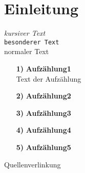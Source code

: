 \chapter{Einleitung}
\textit{kursiver Text} \\
\texttt{besonderer Text} \\
normaler Text
\begin{itemize}
\item[\textbf{1)}] \textbf{Aufzählung1}\\
Text der Aufzählung
\item [\textbf{2)}]\textbf{Aufzählung2}
\item [\textbf{3)}]\textbf{Aufzählung3}
\item [\textbf{4)}]\textbf{Aufzählung4}
\item [\textbf{5)}]\textbf{Aufzählung5}
\end{itemize}
Quellenverlinkung \cite{UCS_XDL_UseCaseSenarios}

